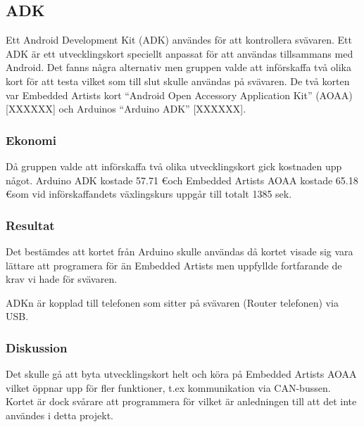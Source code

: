 \subsection{ADK}
Ett Android Development Kit (ADK) användes för att kontrollera svävaren. 
Ett ADK är ett utvecklingskort speciellt anpassat för att användas tillsammans med Android.
Det fanns några alternativ men gruppen valde att införskaffa två olika kort för att testa 
vilket som till slut skulle användas på svävaren. De två korten var Embedded Artists kort 
``Android Open Accessory Application Kit'' (AOAA) [XXXXXX] och Arduinos ``Arduino ADK'' [XXXXXX]. 

\subsubsection{Ekonomi}
Då gruppen valde att införskaffa två olika utvecklingskort gick kostnaden upp något. Arduino ADK kostade 57.71 \euro och 
Embedded Artists AOAA kostade 65.18 \euro som vid införskaffandets växlingskurs uppgår till totalt 1385 sek. 

\subsubsection{Resultat}
Det bestämdes att kortet från Arduino skulle användas då kortet visade sig vara 
lättare att programera för än Embedded Artists men uppfyllde fortfarande de krav vi hade för svävaren. 

ADKn är kopplad till telefonen som sitter på svävaren (Router telefonen) via USB.
\subsubsection{Diskussion}
Det skulle gå att byta utvecklingskort helt och köra på Embedded Artists AOAA vilket öppnar upp för fler funktioner, 
t.ex kommunikation via CAN-bussen. Kortet är dock svårare att programmera för vilket är anledningen till att det inte användes
i detta projekt.